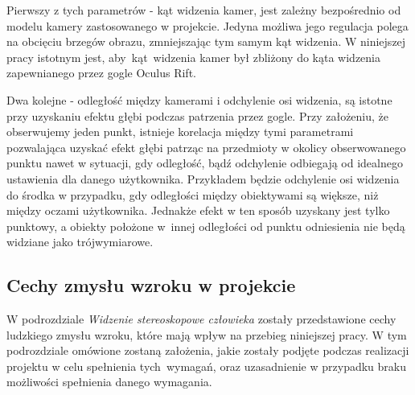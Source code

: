 \documentclass[a4paper,11pt,twoside]{report}
\theoremstyle{definition}
\begin{document}
Pierwszy z tych parametrów - kąt widzenia kamer, jest zależny bezpośrednio od modelu kamery zastosowanego w projekcie. Jedyna możliwa jego regulacja polega na obcięciu brzegów obrazu, zmniejszając tym samym kąt widzenia. W niniejszej pracy istotnym jest, aby~kąt~widzenia kamer był zbliżony do kąta widzenia zapewnianego przez gogle Oculus Rift.

Dwa kolejne - odległość między kamerami i odchylenie osi widzenia, są istotne przy uzyskaniu efektu głębi podczas patrzenia przez gogle. Przy założeniu, że obserwujemy jeden punkt, istnieje korelacja między tymi parametrami pozwalająca uzyskać efekt głębi patrząc na przedmioty w okolicy obserwowanego punktu nawet w sytuacji, gdy odległość, bądź odchylenie odbiegają od idealnego ustawienia dla danego użytkownika. Przykładem będzie odchylenie osi widzenia do środka w przypadku, gdy odległości między obiektywami są większe, niż między oczami użytkownika. Jednakże efekt w ten sposób uzyskany jest tylko punktowy, a obiekty położone w~innej odległości od punktu odniesienia nie będą widziane jako trójwymiarowe.

\subsection{Cechy zmysłu wzroku w projekcie}

W podrozdziale \textit{Widzenie stereoskopowe człowieka} zostały przedstawione cechy ludzkiego zmysłu wzroku, które mają wpływ na przebieg niniejszej pracy. W tym podrozdziale omówione zostaną założenia, jakie zostały podjęte podczas realizacji projektu w celu spełnienia tych~wymagań, oraz uzasadnienie w przypadku braku możliwości spełnienia danego wymagania.
\end{document}
